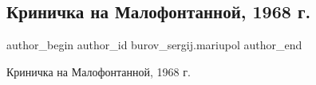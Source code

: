  
 
 
 
 

\subsection{Криничка на Малофонтанной, 1968 г.}
\label{sec:18_09_2019.fb.burov_sergij.mariupol.1.krinichka_na_malofon}

\ifcmt
 author_begin
   author_id burov_sergij.mariupol
 author_end
\fi

Криничка на Малофонтанной, 1968 г.

